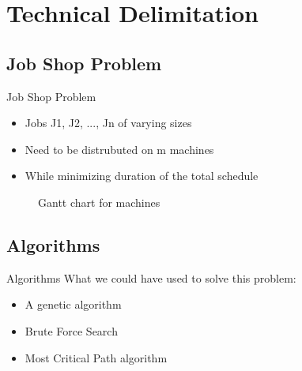 \section{Technical Delimitation}{
\subsection{Job Shop Problem}{

    \begin{frame}{Job Shop Problem}{}
        \begin{itemize}
            \item{Jobs J1, J2, ..., Jn of varying sizes}
            \item{Need to be distrubuted on m machines}
            \item{While minimizing duration of the total schedule}
        \end{itemize}
    \begin{figure} 
            \centering
                \caption{Gantt chart for machines}
            \label{Excel}
        \end{figure}
    \end{frame}
}

\subsection{Algorithms}{
    \begin{frame}{Algorithms}{}
    What we could have used to solve this problem:
    \begin{itemize}
        \item{A genetic algorithm}
        \item{Brute Force Search}
        \item{Most Critical Path algorithm}
    \end{itemize}
    \end{frame}

}}
